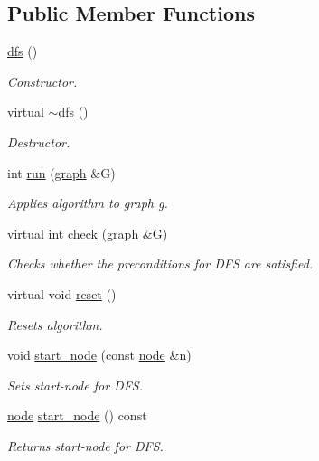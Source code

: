 \subsection*{Public Member Functions}
\begin{DoxyCompactItemize}
\item 
\mbox{\hyperlink{classdfs_afe4e213d3f1f88a4ff57b2d72de232f4}{dfs}} ()
\begin{DoxyCompactList}\small\item\em Constructor. \end{DoxyCompactList}\item 
virtual \mbox{\hyperlink{classdfs_aff2e95c12935221a94551393f7e36c6e}{$\sim$dfs}} ()
\begin{DoxyCompactList}\small\item\em Destructor. \end{DoxyCompactList}\item 
int \mbox{\hyperlink{classdfs_af0863b8974d5fd58cd0375c78ed8163b}{run}} (\mbox{\hyperlink{classgraph}{graph}} \&G)
\begin{DoxyCompactList}\small\item\em Applies algorithm to graph g. \end{DoxyCompactList}\item 
virtual int \mbox{\hyperlink{classdfs_a1af70060897529e67910f589b047e576}{check}} (\mbox{\hyperlink{classgraph}{graph}} \&G)
\begin{DoxyCompactList}\small\item\em Checks whether the preconditions for D\+FS are satisfied. \end{DoxyCompactList}\item 
virtual void \mbox{\hyperlink{classdfs_affaffda8be8418d6dbf396c5b1d6b81a}{reset}} ()
\begin{DoxyCompactList}\small\item\em Resets algorithm. \end{DoxyCompactList}\item 
void \mbox{\hyperlink{classdfs_aad21fd0d3036350fd341f877d5747852}{start\+\_\+node}} (const \mbox{\hyperlink{classnode}{node}} \&n)
\begin{DoxyCompactList}\small\item\em Sets start-\/node for D\+FS. \end{DoxyCompactList}\item 
\mbox{\hyperlink{classnode}{node}} \mbox{\hyperlink{classdfs_a7688d8eaf1308438820fec2ffe21257c}{start\+\_\+node}} () const
\begin{DoxyCompactList}\small\item\em Returns start-\/node for D\+FS. \end{DoxyCompactList}\item 

\end{DoxyCompactItemize}

